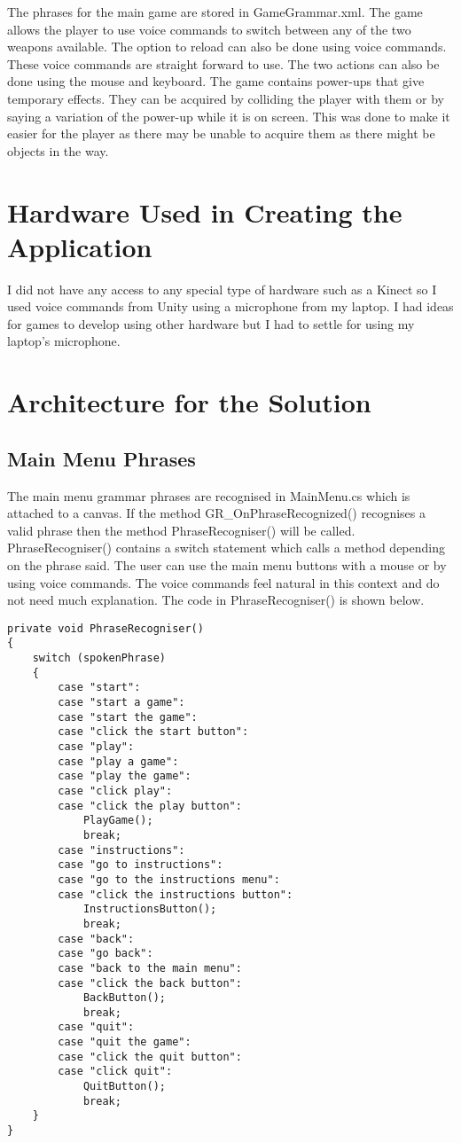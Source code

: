\documentclass{article}
\begin{document}
The phrases for the main game are stored in GameGrammar.xml. The game allows the player to use voice commands to switch between any of the two weapons available. The option to reload can also be done using voice commands. These voice commands are straight forward to use. The two actions can also be done using the mouse and keyboard. The game contains power-ups that give temporary effects. They can be acquired by colliding the player with them or by saying a variation of the power-up while it is on screen. This was done to make it easier for the player as there may be unable to acquire them as there might be objects in the way.

\section{Hardware Used in Creating the Application}
I did not have any access to any special type of hardware such as a Kinect so I used voice commands from Unity using a microphone from my laptop. I had ideas for games to develop using other hardware but I had to settle for using my laptop's microphone.

\section{Architecture for the Solution}
\subsection{Main Menu Phrases}
The main menu grammar phrases are recognised in MainMenu.cs which is attached to a canvas. If the method GR\_OnPhraseRecognized() recognises a valid phrase then the method PhraseRecogniser() will be called. PhraseRecogniser() contains a switch statement which calls a method depending on the phrase said. The user can use the main menu buttons with a mouse or by using voice commands. The voice commands feel natural in this context and do not need much explanation. The code in PhraseRecogniser() is shown below.
\begin{verbatim}
private void PhraseRecogniser()
{
    switch (spokenPhrase)
    {
        case "start":
        case "start a game":
        case "start the game":
        case "click the start button":
        case "play":
        case "play a game":
        case "play the game":
        case "click play":
        case "click the play button":
            PlayGame();
            break;
        case "instructions":
        case "go to instructions":
        case "go to the instructions menu":
        case "click the instructions button":
            InstructionsButton();
            break;
        case "back":
        case "go back":
        case "back to the main menu":
        case "click the back button":
            BackButton();
            break;
        case "quit":
        case "quit the game":
        case "click the quit button":
        case "click quit":
            QuitButton();
            break;
    }
}
\end{verbatim}
\end{document}
